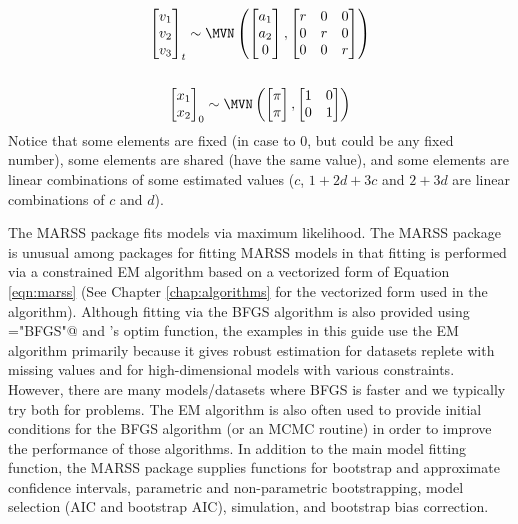 \begin{gather*}
\begin{bmatrix}v_1\\ v_2\\ v_3\end{bmatrix}_t \sim \MVN\begin{pmatrix}\begin{bmatrix}a_1\\ a_2\\ 0\end{bmatrix},
 \begin{bmatrix}r&0&0\\0&r&0\\0&0&r\end{bmatrix} \end{pmatrix}  \\
\\
\begin{bmatrix}x_1\\ x_2\end{bmatrix}_0 \sim \MVN\begin{pmatrix}\begin{bmatrix}\pi\\ \pi\end{bmatrix},\begin{bmatrix}1&0\\ 0&1\end{bmatrix} \end{pmatrix}
\end{gather*}
Notice that some elements are fixed (in case to 0, but could be any fixed number), some elements are shared (have the same value), and some elements are linear combinations of some estimated values ($c$, $1+2d+3c$ and $2+3d$ are linear combinations of $c$ and $d$).

The MARSS package fits models via maximum likelihood. The MARSS package is unusual among packages for fitting MARSS models in that fitting is performed via a constrained EM algorithm \citep{Holmes2010} based on a vectorized form of Equation \ref{eqn:marss} (See Chapter \ref{chap:algorithms} for the vectorized form used in the algorithm).  Although fitting via the BFGS algorithm is also provided using \verb@method="BFGS"@ and \R's optim function, the examples in this guide use the EM algorithm primarily because it gives robust estimation for datasets replete with missing values and for high-dimensional models with various constraints. However, there are many models/datasets where BFGS is faster and we typically try both for problems.  The EM algorithm is also often used to provide initial conditions for the BFGS algorithm (or an MCMC routine) in order to improve the performance of those algorithms.  In addition to the main model fitting function, the MARSS package  supplies functions for bootstrap and approximate confidence intervals, parametric and non-parametric bootstrapping, model selection (AIC and bootstrap AIC), simulation, and bootstrap bias correction.

